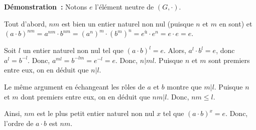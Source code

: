 \medskip

\noindent\textbf{Démonstration :} 
    Notons $e$ l'élément neutre de $(G, \cdot)$.

    Tout d'abord, $n m$ est bien un entier naturel non nul (puisque $n$ et $m$ en sont) et $(a \cdot b)^{n m} = a^{n m} \cdot b^{n m} = (a^n)^m \cdot (b^m)^n = e^ù \cdot e^n = e \cdot e = e$.

    Soit $l$ un entier naturel non nul tel que $(a \cdot b)^l = e$.
    Alors, $a^l \cdot b^l = e$, donc $a^l = b^{-l}$. 
    Donc, $a^{m l} = b^{- l m} = e^{-l} = e$.
    Donc, $n \vert m l$.
    Puisque $n$ et $m$ sont premiers entre eux, on en déduit que $n \vert l$. 

    Le même argument en échangeant les rôles de $a$ et $b$ montre que $m \vert l$.
    Puisque $n$ et $m$ dont premiers entre eux, on en déduit que $n m \vert l$.
    Donc, $n m \leq l$. 

    Ainsi, $n m$ est le plus petit entier naturel non nul $x$ tel que $(a \cdot b)^x = e$.
    Donc, l'ordre de $a \cdot b$ est $n m$.

    \done
